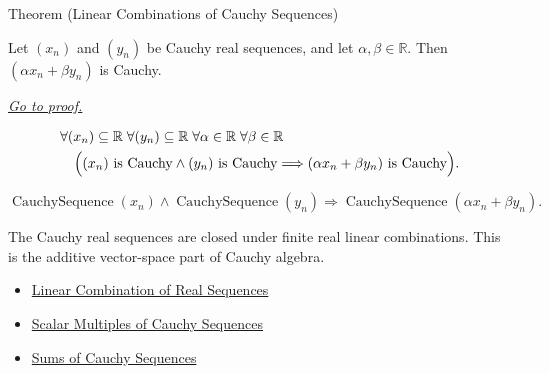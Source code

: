 \begin{theorembox}{Theorem (Linear Combinations of Cauchy Sequences)}
\begin{theorem}
\label{thm:linear-combination-cauchy-sequences}
Let $(x_n)$ and $(y_n)$ be Cauchy real sequences, and let
$\alpha,\beta\in\mathbb{R}$. Then $(\alpha x_n+\beta y_n)$ is Cauchy.

\smallskip
\noindent
\hyperref[prf:linear-combination-cauchy-sequences]{\textit{Go to proof.}}
\end{theorem}
\end{theorembox}

\begin{remark*}
\[
\begin{aligned}
&\forall (x_n)\subseteq\mathbb{R}\;\forall (y_n)\subseteq\mathbb{R}\;
 \forall \alpha\in\mathbb{R}\;\forall \beta\in\mathbb{R}\\
&\quad
\Bigl(
  (x_n)\text{ is Cauchy}
  \land
  (y_n)\text{ is Cauchy}
  \Longrightarrow
  (\alpha x_n+\beta y_n)\text{ is Cauchy}
\Bigr).
\end{aligned}
\]
\end{remark*}

\begin{remark*}
\[
\operatorname{CauchySequence}(x_n)
\land
\operatorname{CauchySequence}(y_n)
\Longrightarrow
\operatorname{CauchySequence}(\alpha x_n+\beta y_n).
\]
\end{remark*}

\begin{remark*}[Interpretation]
The Cauchy real sequences are closed under finite real linear combinations.
This is the additive vector-space part of Cauchy algebra.
\end{remark*}

\begin{dependencies}
\begin{itemize}
  \item \hyperref[def:linear-combination-of-real-sequences]{Linear Combination of Real Sequences}
  \item \hyperref[thm:scalar-multiple-cauchy-sequence]{Scalar Multiples of Cauchy Sequences}
  \item \hyperref[thm:sum-cauchy-sequences]{Sums of Cauchy Sequences}
\end{itemize}
\end{dependencies}


